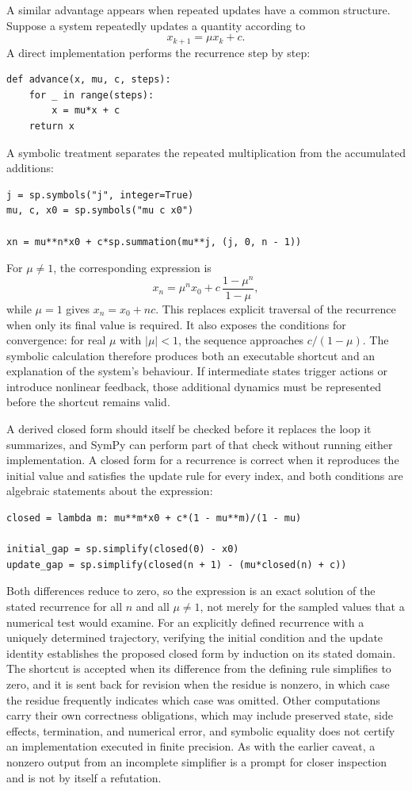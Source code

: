 \documentclass[11pt]{article}
\theoremstyle{remark}
\begin{document}
A similar advantage appears when repeated updates have a common structure. Suppose a system repeatedly updates a quantity according to
\begin{equation}
x_{k+1} = \mu x_k + c.
\end{equation}
A direct implementation performs the recurrence step by step:
\begin{verbatim}
def advance(x, mu, c, steps):
    for _ in range(steps):
        x = mu*x + c
    return x
\end{verbatim}
A symbolic treatment separates the repeated multiplication from the accumulated additions:
\begin{verbatim}
j = sp.symbols("j", integer=True)
mu, c, x0 = sp.symbols("mu c x0")

xn = mu**n*x0 + c*sp.summation(mu**j, (j, 0, n - 1))
\end{verbatim}
For $\mu \neq 1$, the corresponding expression is
\begin{equation}
x_n = \mu^n x_0 + c\,\frac{1-\mu^n}{1-\mu},
\end{equation}
while $\mu = 1$ gives $x_n = x_0 + nc$. This replaces explicit traversal of the recurrence when only its final value is required. It also exposes the conditions for convergence: for real $\mu$ with $|\mu| < 1$, the sequence approaches $c/(1-\mu)$. The symbolic calculation therefore produces both an executable shortcut and an explanation of the system's behaviour. If intermediate states trigger actions or introduce nonlinear feedback, those additional dynamics must be represented before the shortcut remains valid.

A derived closed form should itself be checked before it replaces the loop it summarizes, and SymPy can perform part of that check without running either implementation. A closed form for a recurrence is correct when it reproduces the initial value and satisfies the update rule for every index, and both conditions are algebraic statements about the expression:
\begin{verbatim}
closed = lambda m: mu**m*x0 + c*(1 - mu**m)/(1 - mu)

initial_gap = sp.simplify(closed(0) - x0)
update_gap = sp.simplify(closed(n + 1) - (mu*closed(n) + c))
\end{verbatim}
Both differences reduce to zero, so the expression is an exact solution of the stated recurrence for all $n$ and all $\mu \neq 1$, not merely for the sampled values that a numerical test would examine. For an explicitly defined recurrence with a uniquely determined trajectory, verifying the initial condition and the update identity establishes the proposed closed form by induction on its stated domain. The shortcut is accepted when its difference from the defining rule simplifies to zero, and it is sent back for revision when the residue is nonzero, in which case the residue frequently indicates which case was omitted. Other computations carry their own correctness obligations, which may include preserved state, side effects, termination, and numerical error, and symbolic equality does not certify an implementation executed in finite precision. As with the earlier caveat, a nonzero output from an incomplete simplifier is a prompt for closer inspection and is not by itself a refutation.
\end{document}
